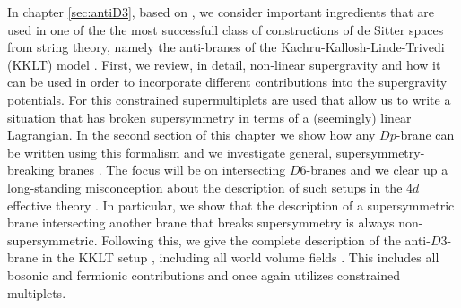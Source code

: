 \documentclass[a4paper,12pt]{report}
\begin{document}
In chapter \ref{sec:antiD3}, based on \cite{Cribiori:2019hod,Cribiori:2020bgt}, we consider important ingredients that are used in one of the the most successfull class of constructions of de Sitter spaces from string theory, namely the anti-branes of the Kachru-Kallosh-Linde-Trivedi (KKLT) model \cite{Kachru:2003aw}. First, we review, in detail, non-linear supergravity and how it can be used in order to incorporate different contributions into the supergravity potentials. For this constrained supermultiplets \cite{Rocek:1978nb,Lindstrom:1979kq,Samuel:1982uh,Komargodski:2009rz,DallAgata:2016syy,Ferrara:2016een} are used that allow us to write a situation that has broken supersymmetry in terms of a (seemingly) linear Lagrangian. In the second section of this chapter we show how any $Dp$-brane can be written using this formalism \cite{Cribiori:2020bgt} and we investigate general, supersymmetry-breaking branes \cite{Sugimoto:1999tx,Antoniadis:1999xk,Angelantonj:1999jh,Aldazabal:1999jr,Angelantonj:1999ms,Dudas:2000nv,Pradisi:2001yv}. The focus will be on intersecting $D6$-branes and we clear up a long-standing misconception about the description of such setups in the $4d$ effective theory \cite{Villadoro:2006ia,Blumenhagen:2002wn,Kachru:1999vj,Cvetic:2001nr}. In particular, we show that the description of a supersymmetric brane intersecting another brane that breaks supersymmetry is always non-supersymmetric. Following this, we give the complete description of the anti-$D3$-brane in the KKLT setup \cite{Cribiori:2019hod}, including all world volume fields \cite{GarciadelMoral:2017vnz}. This includes all bosonic and fermionic contributions and once again utilizes constrained multiplets.\\
\end{document}
